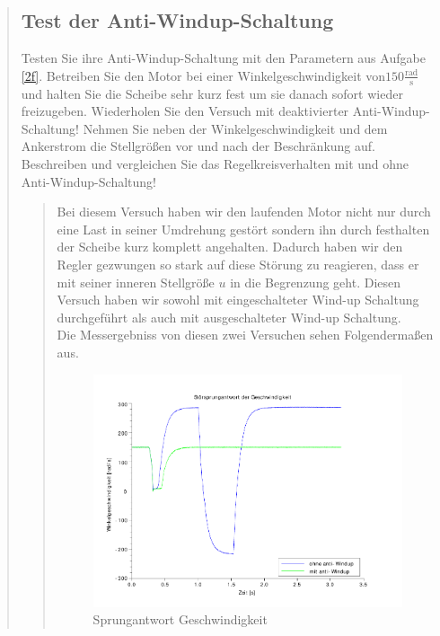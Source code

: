 \begin{quote}
    \subsection{Test der Anti-Windup-Schaltung}
    Testen Sie ihre Anti-Windup-Schaltung mit den Parametern aus Aufgabe \ref{2f}. Betreiben
    Sie den Motor bei einer Winkelgeschwindigkeit von$150 \mathrm{\frac{rad}{s}}$
    und halten Sie die Scheibe
    sehr kurz fest um sie danach sofort wieder freizugeben. Wiederholen Sie den Versuch mit
    deaktivierter Anti-Windup-Schaltung! Nehmen Sie neben der Winkelgeschwindigkeit
    und dem Ankerstrom die Stellgrößen vor und nach der Beschränkung auf. Beschreiben
    und vergleichen Sie das Regelkreisverhalten mit und ohne Anti-Windup-Schaltung!
    
    \begin{quote}
        
        Bei diesem Versuch haben wir den laufenden Motor nicht nur durch eine Last in seiner Umdrehung gestört sondern
        ihn durch festhalten der Scheibe kurz komplett angehalten. Dadurch haben wir den Regler gezwungen so stark auf
        diese Störung zu reagieren, dass er mit seiner inneren Stellgröße $u$ in die Begrenzung geht. Diesen Versuch
        haben wir sowohl mit eingeschalteter Wind-up Schaltung durchgeführt als auch mit ausgeschalteter Wind-up
        Schaltung.\\
        
        Die Messergebniss von diesen zwei Versuchen sehen Folgendermaßen aus.

        \begin{figure}[H]
        \centering
            \includegraphics[scale=0.8, trim = 0.5cm 0.5cm 2cm 0.5cm,
            clip]{./Bilder/windup_sprungantwort_Geschwindigkeit}    
            \caption{Sprungantwort Geschwindigkeit}
        \end{figure}
        

\end{quote}
\end{quote}
